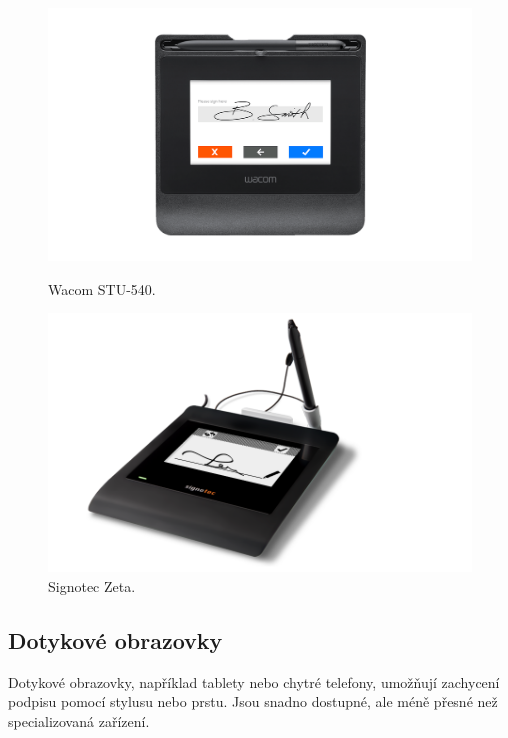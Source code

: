 \begin{figure}[H]
  \centering
  \begin{minipage}{0.45\textwidth}
      \centering
      \includegraphics[width=\textwidth]{obrazky-figures/wacom.png}
      \caption{Wacom STU-540.~\cite{Wacom_STU_540}}
      \label{fig:Wacom}
  \end{minipage}
  \begin{minipage}{0.45\textwidth}
      \centering
      \includegraphics[width=\textwidth]{obrazky-figures/signotec.png}
      \caption{Signotec Zeta.~\cite{Signotec_Zeta}}
      \label{fig:Signotec}
  \end{minipage}
\end{figure}


\subsection*{Dotykové obrazovky}
Dotykové obrazovky, například tablety nebo chytré telefony, umožňují zachycení podpisu pomocí stylusu nebo prstu. 
Jsou snadno dostupné, ale méně přesné než specializovaná zařízení.

